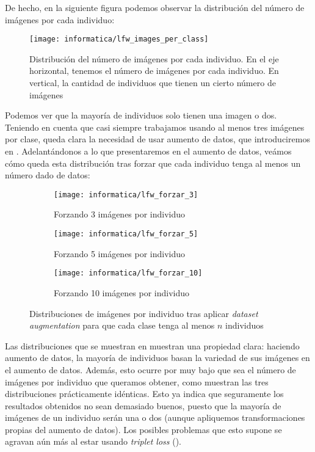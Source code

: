 De hecho, en la siguiente figura podemos observar la distribución del número de imágenes por cada individuo:

\begin{figure}[H]
    \centering
    \texttt{[image: informatica/lfw\_images\_per\_class]}
    \caption{Distribución del número de imágenes por cada individuo. En el eje horizontal, tenemos el número de imágenes por cada individuo. En vertical, la cantidad de individuos que tienen un cierto número de imágenes}
\end{figure}

Podemos ver que la mayoría de individuos solo tienen una imagen o dos. Teniendo en cuenta que casi siempre trabajamos usando al menos tres imágenes por clase, queda clara la necesidad de usar aumento de datos, que introduciremos en . Adelantándonos a lo que presentaremos en el aumento de datos, veámos cómo queda esta distribución tras forzar que cada individuo tenga al menos un número dado de datos:

\begin{figure}[H]
\centering
    \begin{subfigure}{0.5\textwidth}
        \centering
        \texttt{[image: informatica/lfw\_forzar\_3]}
        \caption{Forzando 3 imágenes por individuo }
    \end{subfigure}%
    \begin{subfigure}{.5\textwidth}
        \centering
        \texttt{[image: informatica/lfw\_forzar\_5]}
        \caption{Forzando 5 imágenes por individuo}
    \end{subfigure}

    \begin{subfigure}{.5\textwidth}
        \centering
        \texttt{[image: informatica/lfw\_forzar\_10]}
        \caption{Forzando 10 imágenes por individuo }
    \end{subfigure}

    \caption{Distribuciones de imágenes por individuo tras aplicar \textit{dataset augmentation} para que cada clase tenga al menos $n$ individuos}
    \label{img:distribuciones_forzar_data_augmentation}
\end{figure}

Las distribuciones que se muestran en  muestran una propiedad clara: haciendo aumento de datos, la mayoría de individuos basan la variedad de sus imágenes en el aumento de datos. Además, esto ocurre por muy bajo que sea el número de imágenes por individuo que queramos obtener, como muestran las tres distribuciones prácticamente idénticas. Esto ya indica que seguramente los resultados obtenidos no sean demasiado buenos, puesto que la mayoría de imágenes de un individuo serán una o dos  (aunque apliquemos transformaciones propias del aumento de datos). Los posibles problemas que esto supone se agravan aún más al estar usando \textit{triplet loss} ().

